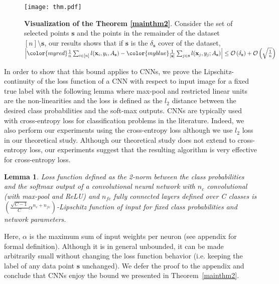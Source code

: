 \documentclass{article} \usepackage{iclr2018_conference,times}
\makeatletter
\newtheorem{lemma}{Lemma}
\newcommand*{\ie}{i.e.\@\xspace}
\makeatother
\begin{document}
\begin{figure}[t]
\vspace{-5mm}
    \begin{center} \texttt{[image: thm.pdf]} \end{center} 
        \caption{\textbf{Visualization of the Theorem \ref{mainthm2}}. Consider the set of selected points
        {\color{myblue} $\mathbf{s}$} and the points in the remainder of the dataset {\color{myred} $[n] \setminus
        \mathbf{s}$}, our results shows that if $\mathbf{s}$ is the $\delta_{\mathbf{s}}$ cover of the dataset, 
        $\left| {\color{myred} \frac{1}{n}\sum_{i \in [n]} l(\mathbf{x}_i,y_i,A_{\mathbf{s}})} -{\color{myblue} \frac{1}{|\mathbf{s}|}\sum_{j \in
        \mathbf{s}} l(\mathbf{x}_j,y_j;A_{\mathbf{s}})}
    \right| \leq \mathcal{O}\left(\delta_\mathbf{s}\right) + \mathcal{O}\left(\sqrt{\frac{1}{n}}\right)$}
    \label{fig:thm}
    \end{figure}

In order to show that this bound applies to CNNs, we prove the Lipschitz-continuity of the loss function of a CNN with respect to input image for a fixed true label with the following lemma where max-pool and restricted linear units are the non-linearities and the loss is defined as the $l_2$ distance between the desired class probabilities and the soft-max outputs. CNNs are typically used with cross-entropy loss for classification problems in the literature. Indeed, we also perform our experiments using the cross-entropy loss although we use $l_2$ loss in our theoretical study. Although our theoretical study does not extend to cross-entropy loss, our experiments suggest that the resulting algorithm is very effective for cross-entropy loss.

\begin{lemma} 
Loss function defined as the 2-norm between the class
probabilities and the softmax output of a convolutional neural network with $n_c$ convolutional (with max-pool and ReLU) and $n_{fc}$ fully connected layers defined over C classes is $\left(\frac{\sqrt{C-1}}{C} \alpha^{n_c+n_{fc}}\right)$-Lipschitz function of input for fixed class probabilities and network parameters. \end{lemma}

Here, $\alpha$ is the maximum sum of  input weights per neuron (see appendix for formal definition). Although it is in
general unbounded, it can be made arbitrarily small without changing the loss function behavior (\ie keeping the label
of any data point $\mathbf{s}$ unchanged). We defer the proof to the appendix and conclude that CNNs enjoy the bound we
presented in Theorem~\ref{mainthm2}.
\end{document}
